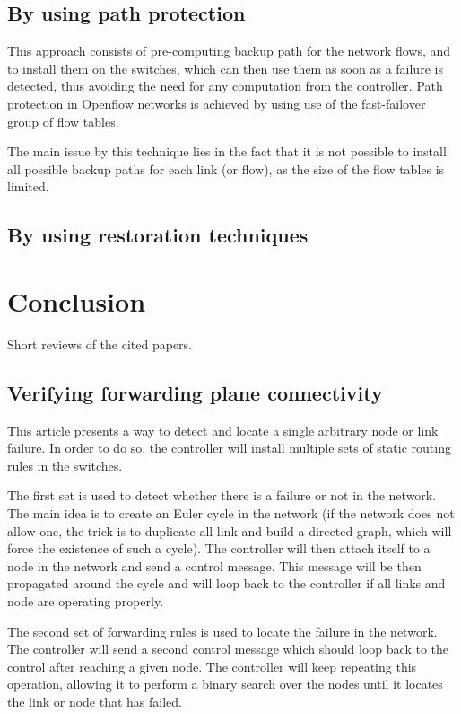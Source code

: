\documentclass[compsoc]{IEEEtran}
\begin{document}
\subsection{By using path protection}
This approach consists of pre-computing backup path for the network flows, and to install them on the switches, which can then use them as soon as a failure is detected, thus avoiding the need for any computation from the controller. Path protection in Openflow networks is achieved by using use of the fast-failover group of flow tables.

The main issue by this technique lies in the fact that it is not possible to install all possible backup paths for each link (or flow), as the size of the flow tables is limited.

\subsection{By using restoration techniques}

\section{Conclusion}


\nocite{*}


\appendix
Short reviews of the cited papers.
\subsection{Verifying forwarding plane connectivity \cite{2013arXiv1308.4465K}}
This article presents a way to detect and locate a single arbitrary node or link failure.
In order to do so, the controller will install multiple sets of static routing rules in the switches.

The first set is used to detect whether there is a failure or not in the network.
The main idea is to create an Euler cycle in the network (if the network does not allow one, the trick is to duplicate all link and build a directed graph, which will force the existence of such a cycle). The controller will then attach itself to a node in the network and send a control message. This message will be then propagated around the cycle and will loop back to the controller if all links and node are operating properly.

The second set of forwarding rules is used to locate the failure in the network. The controller will send a second control message which should loop back to the control after reaching a given node. The controller will keep repeating this operation, allowing it to perform a binary search over the nodes until it locates the link or node that has failed.
\end{document}
